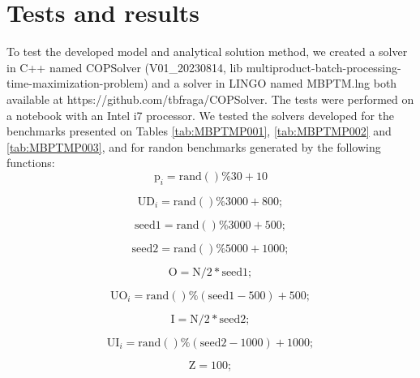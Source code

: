 \documentclass[authoryear,manuscript,12pt]{elsarticle}
\begin{document}
\section{Tests and results}
\label{sec:results}

To test the developed model and analytical solution method, we created a solver in C++ named COPSolver (V01\_20230814, lib multiproduct-batch-processing-time-maximization-problem) and a solver in LINGO named MBPTM.lng both available at https://github.com/tbfraga/COPSolver. The tests were performed on a notebook with an Intel i7 processor. We tested the solvers developed for the benchmarks presented on Tables \ref{tab:MBPTMP001}, \ref{tab:MBPTMP002} and \ref{tab:MBPTMP003}, and for randon benchmarks generated by the following functions: \\

\begin{equation}
\textrm{p}_i = \textrm{rand}()\%30 + 10
\end{equation}

\begin{equation}
\textrm{UD}_i = \textrm{rand}()\%3000 + 800;
\end{equation}

\begin{equation}
 \textrm{seed1} = \textrm{rand}()\%3000 + 500;
\end{equation}

\begin{equation}
\textrm{seed2} = \textrm{rand}()\%5000 + 1000;
\end{equation}

\begin{equation}
\textrm{O} = \textrm{N}/2*\textrm{seed1};
\end{equation}

\begin{equation}
\textrm{UO}_i = \textrm{rand}()\%(\textrm{seed1}-500) + 500;
\end{equation}

\begin{equation}
\textrm{I} = \textrm{N}/2*\textrm{seed2};
\end{equation}

\begin{equation}
\textrm{UI}_i = \textrm{rand}()\%(\textrm{seed2}-1000) + 1000;
\end{equation}

\begin{equation}
\textrm{Z} = 100;
\end{equation}
\end{document}
